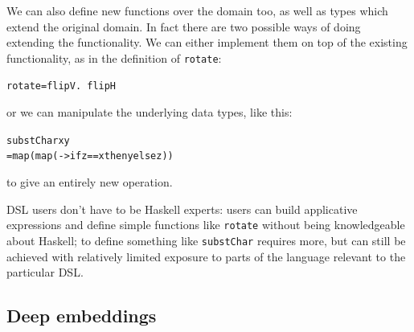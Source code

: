 We can also define new functions over the domain too, as well as types which extend the original domain. In fact there are two possible ways of doing extending the functionality. We can either implement them on top of the existing functionality, as in the definition of \texttt{rotate}:
\begin{alltt}
rotate = flipV .\ flipH
\end{alltt}
or we can manipulate the underlying data types, like this:
\begin{alltt}
substChar x y
  = map (map ( -> if z==x then y else z))
\end{alltt}
to give an entirely new operation.

DSL users don't have to be Haskell experts: users can build applicative expressions and define simple functions like \texttt{rotate} without being knowledgeable about Haskell; to define something like \texttt{substChar} requires more, but can still be achieved with relatively limited exposure to parts of the language relevant to the particular DSL. 

\subsection*{Deep embeddings}

